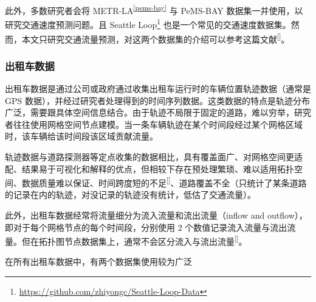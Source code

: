 \documentclass{ctexart}
\renewcommand{\cite}[1]{\textsuperscript{[\citenum{#1}]}}
\begin{document}
此外，多数研究者会将 METR-LA\textsuperscript{\ref{pems-bay}} 与 PeMS-BAY 数据集一并使用，以研究交通速度预测问题。且 Seattle Loop\footnote{\url{https://github.com/zhiyongc/Seattle-Loop-Data}} 也是一个常见的交通速度数据集。然而，本文只研究交通流量预测，对这两个数据集的介绍可以参考这篇文献\cite{T-ZS2}。

\subsubsection{出租车数据}\label{subsubsection:taxidata}

出租车数据是通过公司或政府通过收集出租车运行时的车辆位置轨迹数据（通常是 GPS 数据），并经过研究者处理得到的时间序列数据。这类数据的特点是轨迹分布广泛，需要跟具体空间信息结合。由于轨迹不局限于固定的道路，难以穷举，研究者往往使用网格空间节点建模。当一条车辆轨迹在某个时间段经过某个网格区域时，该车辆给该时间段该区域贡献流量。

轨迹数据与道路探测器等定点收集的数据相比，具有覆盖面广、对网格空间更适配、结果易于可视化和解释的优点，但相较下存在预处理繁琐、难以适用拓扑空间、数据质量难以保证、时间跨度短的不足\cite{T-ZS1}、道路覆盖不全（只统计了某条道路的记录在内的轨迹，对没记录的轨迹没有统计，低估了交通流量）。

此外，出租车数据经常将流量细分为流入流量和流出流量（inflow and outflow），即对于每个网格节点的每个时间段，分别使用 $2$ 个数值记录流入流量与流出流量。但在拓扑图节点数据集上，通常不会区分流入与流出流量\cite{T-ZS45}。

在所有出租车数据中，有两个数据集使用较为广泛
\end{document}
